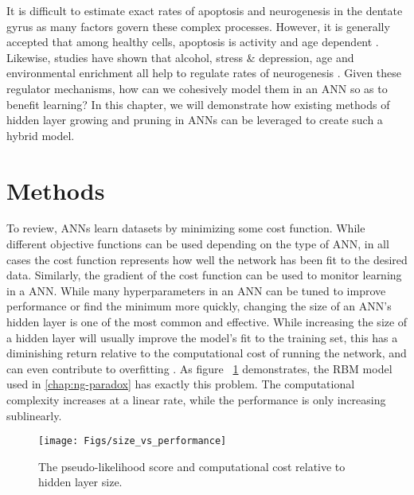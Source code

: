 It is difficult to 
estimate exact rates of apoptosis and neurogenesis 
in the dentate gyrus as many factors govern these complex processes. 
However, it is generally accepted that among healthy cells, apoptosis is 
activity and age dependent \citep{why-neurons-die, cecchi-et-al-01}.
Likewise, studies have shown that alcohol, stress \& depression, age 
and environmental enrichment all help to regulate rates of 
neurogenesis 
\citep{origin_of_microneurons, enrichment-and-activity-dependent-regulation-of-neurogenesis, 
enrichment-dependent-regulation-of-neurogenesis}. 
Given these regulator mechanisms, 
how can we cohesively model them in an \ac{ANN} so as to benefit learning? 
In this chapter, we will 
demonstrate how existing methods of hidden layer growing and 
pruning in \acp{ANN} can be leveraged to create such a 
hybrid model.

\section{Methods}

To review, \acp{ANN} learn datasets by minimizing some cost function. 
While different objective functions can be used depending on the 
type of \ac{ANN}, in all cases the cost function represents how well the 
network has been fit to the desired data. 
Similarly, the gradient of the cost function 
can be used to monitor learning in a \ac{ANN}. 
While many hyperparameters in 
an \ac{ANN} can be tuned to improve performance or find the minimum more quickly, 
changing the size of an \ac{ANN}'s hidden layer is one of the most common and effective. 
While increasing the size of a hidden layer will usually improve the model's fit to the training set, 
this has a diminishing return relative to the computational cost of running the network, 
and can even contribute to overfitting \citep{network-size-baum, network-size-denker, network-size-lecun}. 
As figure ~\ref{fig:size_vs_performance} demonstrates, the \ac{RBM} model 
used in \cref{chap:ng-paradox} has exactly this problem. 
The computational complexity increases 
at a linear rate, while the performance is only increasing 
sublinearly. 

\begin{figure}[!h]
\begin{center}
\texttt{[image: Figs/size\_vs\_performance]}
\end{center}
\caption{The pseudo-likelihood score and 
computational cost relative to hidden layer size.}
\label{fig:size_vs_performance}
\end{figure}

